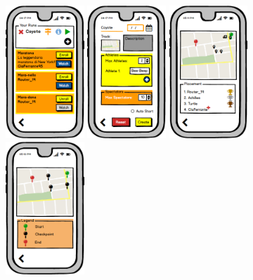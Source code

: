 \documentclass[a4paper]{article}
\begin{document}
        \begin{figure}[!htpb]
    	\centering
    	\includegraphics[height=50mm]{images/mockups/RunManager.png}
    	\includegraphics[height=50mm]{images/mockups/RunCreate.png}
    	\includegraphics[height=50mm]{images/mockups/ShowMap.png}
    	\includegraphics[height=50mm]{images/mockups/DefineTrack.png}
        \end{figure}
     
\end{document}
